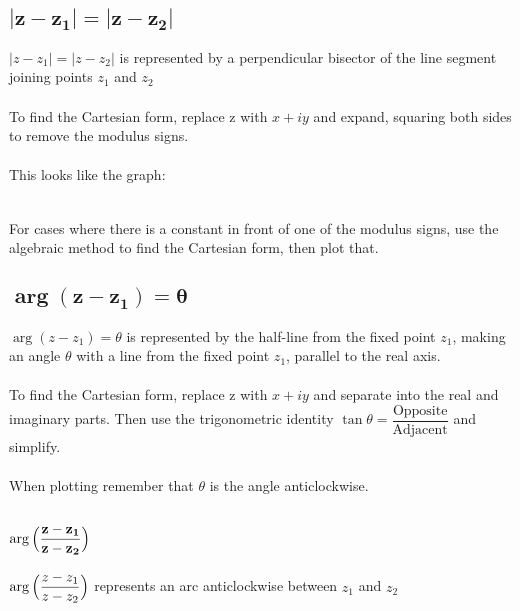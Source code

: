 \documentclass{article}[18pt]
\begin{document}
\subsection{$\mathbf{|z-z_1|=|z-z_2|}$}
$|z-z_1|=|z-z_2|$ is represented by a perpendicular bisector of the line segment joining points $z_1$ and $z_2$\\
\\
To find the Cartesian form, replace z with $x+iy$ and expand, squaring both sides to remove the modulus signs.\\
\\
This looks like the graph:\\
\\
For cases where there is a constant in front of one of the modulus signs, use the algebraic method to find the Cartesian form, then plot that.
\newpage
\subsection{$\mathbf{\arg(z-z_1)=\theta}$}
$\arg(z-z_1)=\theta$ is represented by the half-line from the fixed point $z_1$, making an angle $\theta$ with a line from the fixed point $z_1$, parallel to the real axis.\\
\\
To find the Cartesian form, replace z with $x+iy$ and separate into the real and imaginary parts. Then use the trigonometric identity $\tan\theta=\dfrac{\textrm{Opposite}}{\textrm{Adjacent}}$ and simplify.\\
\\
When plotting remember that $\theta$ is the angle anticlockwise.\\
\subsection{$\mathlarger{\mathbf{\arg\Big(\frac{z-z_1}{z-z_2}\Big)}}$}
$\mathlarger{\arg\Big(\frac{z-z_1}{z-z_2}\Big)}$ represents an arc anticlockwise between $z_1$ and $z_2$
\end{document}
